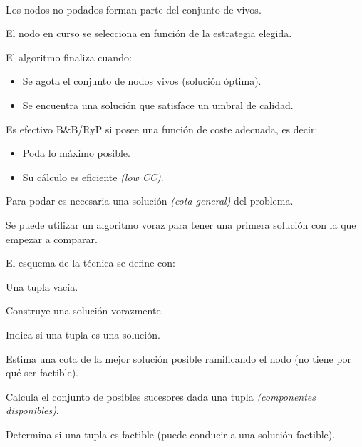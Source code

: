 \documentclass[tikz,11pt,fleqn]{book} %
\begin{document}
\begin{theorem}~

	Los nodos no podados forman parte del conjunto de vivos.

	El nodo en curso se selecciona en función de la estrategia elegida.

	El algoritmo finaliza cuando:
	\begin{itemize}
		\item Se agota el conjunto de nodos vivos (solución óptima).
		\item Se encuentra una solución que satisface un umbral de calidad.
	\end{itemize}

	Es efectivo B\&B/RyP si posee una función de coste adecuada, es decir:
	\begin{itemize}
		\item Poda lo máximo posible.
		\item Su cálculo es eficiente \textit{(low CC)}.
	\end{itemize}

	Para podar es necesaria una solución \textit{(cota general)} del problema.

	Se puede utilizar un algoritmo voraz para tener una primera solución con la que empezar a comparar.

\end{theorem}

El esquema de la técnica se define con:

\begin{definition} Una tupla vacía. \end{definition}
\begin{definition} Construye una solución vorazmente. \end{definition}
\begin{definition}[es\_sln()] Indica si una tupla es una solución. \end{definition}
\begin{definition} Estima una cota de la mejor solución posible ramificando el nodo (no tiene por qué ser factible). \end{definition}
\begin{definition}[complexiones()] Calcula el conjunto de posibles sucesores dada una tupla \textit{(componentes disponibles)}. \end{definition}
\begin{definition}[es\_factible()] Determina si una tupla es factible (puede conducir a una solución factible). \end{definition}
\end{document}
